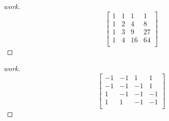 \documentclass{article}
\begin{document}
\begin{question}{1.3}{}
{\begin{enumerate}
\begin{proof}[work]
      \[
        \begin{bmatrix}
          1 & 1 & 1  & 1  \\
          1 & 2 & 4  & 8  \\
          1 & 3 & 9  & 27 \\
          1 & 4 & 16 & 64 \\
        \end{bmatrix}
      \]
    \end{proof}
    \begin{proof}[work]
      \[
        \begin{bmatrix}
          -1 & -1 & 1  & 1  \\
          -1 & -1 & -1 & 1  \\
          1  & -1 & -1 & -1 \\
          1  & 1  & -1 & -1 \\
        \end{bmatrix}
      \]
    \end{proof}
  \end{enumerate}}
\end{question}
\end{document}
